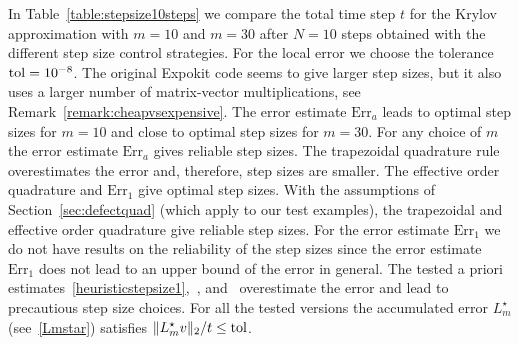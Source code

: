 \documentclass[smallextended]{svjour3pre}%
\numberwithin{equation}{section}
\numberwithin{figure}{section}
\numberwithin{table}{section}
\newcommand{\ttol}{{\rm tol}}
\newcommand\tjnew[1]{{#1}}
\newcommand\Era{\mathrm{Err}_a}
\newcommand\Erone{\mathrm{Err}_1}
\begin{document}
In Table~\ref{table:stepsize10steps} we compare the total time step $t$ for the Krylov approximation with $m=10$ and $m=30$
after $N=10$ steps obtained with the different step size control strategies.
For the local error we choose the tolerance $\ttol=10^{-8}$.
The original Expokit code seems to give larger step sizes,
but it also uses a larger number of matrix-vector multiplications, see Remark~\ref{remark:cheapvsexpensive}.
The error estimate $\Era$ leads to optimal step sizes for $m=10$ and close to optimal step sizes for $m=30$.
For any choice of $m$ the error estimate $\Era$ gives reliable step sizes.
The trapezoidal quadrature rule overestimates the error and, therefore, step sizes are smaller.
The effective order quadrature and $\Erone$ give optimal step sizes.
With the assumptions of Section~\ref{sec:defectquad} (which apply to our test examples), the trapezoidal and effective order quadrature give reliable step sizes.
For the error estimate $\Erone$ we do not have results on the reliability of the step sizes since the error estimate $\Erone$ does not lead to an upper bound of the error \tjnew{in general}.
The tested a priori estimates~\eqref{heuristicstepsize1},~\cite[Th. 4]{hoclub97}, and~\cite[(20)]{mohcar10}
overestimate the error and lead to precautious step size choices.
For all the tested versions the accumulated error
$ L_m^{\star} $ (see~\eqref{Lmstar}) satisfies $\|L_m^{\star} v\|_2/t \leq \ttol$.
\end{document}
